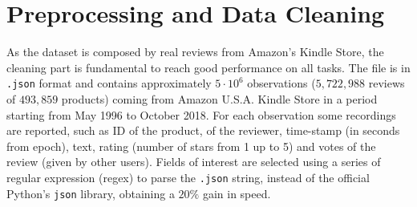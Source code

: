 \documentclass[fleqn,10pt]{SelfArx}
\begin{document}
\section{Preprocessing and Data Cleaning}
As the dataset is composed by real reviews from Amazon's Kindle Store, the cleaning part is fundamental to reach good performance on all tasks.
The file is in \verb|.json| format and contains approximately $5 \cdot 10^6$ observations ($5,722,988$ reviews of $493,859$ products) coming from Amazon U.S.A. Kindle Store in a period starting from May 1996 to October 2018.
For each observation some recordings are reported, such as ID of the product, of the reviewer, time-stamp (in seconds from epoch), text, rating (number of stars from 1 up to 5) and votes of the review (given by other users).
Fields of interest are selected using a series of regular expression (regex) to parse the \verb|.json| string, instead of the official Python's \verb|json| library, obtaining a $20\%$ gain in speed. \newline
\end{document}
